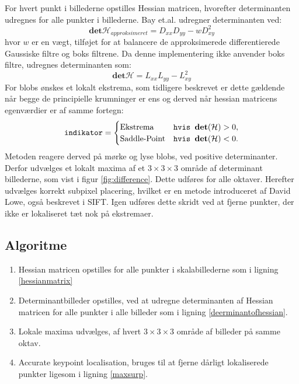 For hvert punkt i billederne opstilles Hessian matricen, hvorefter determinanten udregnes for alle punkter i billederne. Bay et.al. udregner determinanten ved:
\begin{equation}
\textbf{det}\mathcal{H}_{approksimeret} = D_{xx}D_{yy}-wD_{xy}^2
\label{deerminantofhessian}
\end{equation}
hvor $w$ er en vægt, tilføjet for at balancere de approksimerede differentierede Gaussiske filtre og boks filtrene. Da denne implementering ikke anvender boks filtre, udregnes determinanten som:
\begin{equation}
\textbf{det}\mathcal{H} = L_{xx}L_{yy}-L_{xy}^2
\label{deerminantofhessian}
\end{equation}
For blobs ønskes et lokalt ekstrema, som tidligere beskrevet er dette gældende når begge de principielle krumninger er ens og derved når hessian matricens egenværdier er af samme fortegn:
\begin{equation}
\begin{split}
\texttt{indikator} = 
\begin{cases}
\text{Ekstrema}& \texttt{hvis } \bold{det}(\mathcal{H}) > 0,  \\
\text{Saddle-Point} & \texttt{hvis } \bold{det}(\mathcal{H}) < 0.
\end{cases}
\end{split}
\label{detman}
\end{equation}
Metoden reagere derved på mørke og lyse blobs, ved positive determinanter. Derfor udvælges et lokalt maxima af et $3\times3\times3$ område af determinant billederne, som vist i figur \ref{fig:difference}. Dette udføres for alle oktaver. Herefter udvælges korrekt subpixel placering, hvilket er en metode introduceret af David Lowe, også beskrevet i SIFT. Igen udføres dette skridt ved at fjerne punkter, der ikke er lokaliseret tæt nok på ekstremaer.
\subsection*{Algoritme}
\begin{enumerate}
\item {Hessian matricen opstilles for alle punkter i skalabillederne som i ligning \eqref{hessianmatrix}}
\item Determinantbilleder opstilles, ved at udregne determinanten af Hessian matricen for alle punkter i alle billeder som i ligning \eqref{deerminantofhessian}.
\item Lokale maxima udvælges, af hvert $3\times3\times3$ område af billeder på samme oktav.
\item Accurate keypoint localisation, bruges til at fjerne dårligt lokaliserede punkter ligesom i ligning \eqref{maxsurp}.
\end{enumerate}